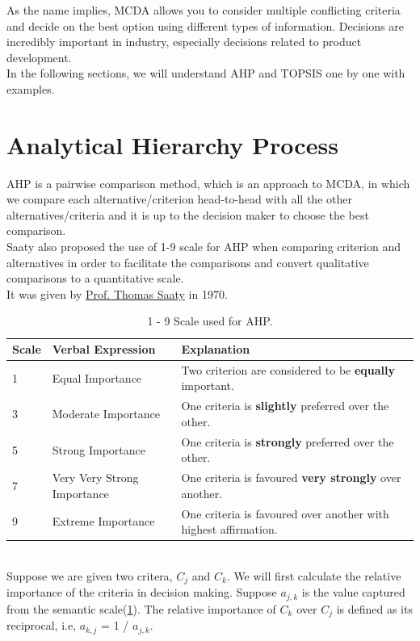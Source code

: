 \documentclass[10pt, a4paper]{article}
\begin{document}
As the name implies, MCDA allows you to consider multiple conflicting criteria and decide on the best option using different types of information. 
Decisions are incredibly important in industry, especially decisions related to product development.\\
In the following sections, we will understand AHP and TOPSIS one by one with examples.
\section{Analytical Hierarchy Process}
 AHP is a pairwise comparison method, which is an approach to MCDA, in which we compare each alternative/criterion head-to-head with all the other alternatives/criteria and it is up to the decision maker to choose the best comparison.\\
 Saaty also proposed the use of 1-9 scale for AHP when comparing criterion and alternatives in order to facilitate the comparisons and convert qualitative comparisons to a quantitative scale.\\
 It was given by \href{https://en.wikipedia.org/wiki/Thomas_L._Saaty}{Prof. Thomas Saaty} in 1970. \\
\begin{table}[h]
\setlength{\arrayrulewidth}{0.25mm}
\setlength{\tabcolsep}{18pt}
\begin{tabular}{ |p{1cm}|p{3cm}|p{5cm}|  }
\hline
\textbf{Scale}& \textbf{Verbal Expression} &\textbf{Explanation} \\
\hline
1 & Equal Importance & Two criterion are considered to be \textbf{equally} important. \\
\hline
3 & Moderate Importance & One criteria is \textbf{slightly} preferred over the other. \\
\hline
5 & Strong Importance & One criteria is \textbf{strongly} preferred over the other. \\
\hline
7 & Very Very Strong Importance & One criteria is favoured \textbf{very strongly} over another. \\
\hline
9 & Extreme Importance & One criteria is favoured over another with highest affirmation. \\
\hline
\end{tabular}
\caption{\label{tab:table1}1 - 9 Scale used for AHP.}
\end{table} \\
Suppose we are given two critera, $C_j$ and $C_k$. We will first calculate the relative importance of the criteria in decision making. Suppose $a_{j,k}$ is the value captured from the semantic scale(\ref{tab:table1}). The relative importance of $C_k$ over $C_j$ is defined as its reciprocal, i.e, $a_{k,j}$ = 1 / $a_{j,k}$.
\end{document}
